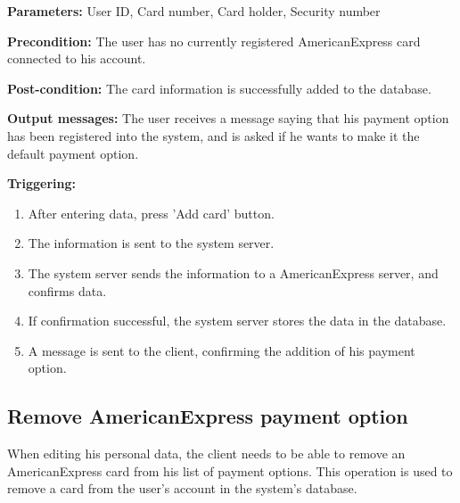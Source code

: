 \begin{description}

\item \textbf{Parameters:} User ID, Card number, Card holder, Security number

\item \textbf{Precondition:} The user has no currently registered AmericanExpress
card connected to his account.

\item \textbf{Post-condition:} The card information is successfully added to the
database.

\item \textbf{Output messages:} The user receives a message saying that his
payment option has been registered into the system, and is asked if he wants to
make it the default payment option.

\item \textbf{Triggering:}
\begin{enumerate}
\item After entering data, press 'Add card' button.

\item The information is sent to the system server.

\item The system server sends the information to a AmericanExpress server, and
confirms data.

\item If confirmation successful, the system server stores the data in the
database.

\item A message is sent to the client, confirming the addition of his payment
option.

\end{enumerate}

\end{description}

\subsection{Remove AmericanExpress payment option}

 When editing his personal data, the client needs to be
 able to remove an AmericanExpress card from his list of payment options. This
 operation is used to remove a card from the user's account in the system's database.

